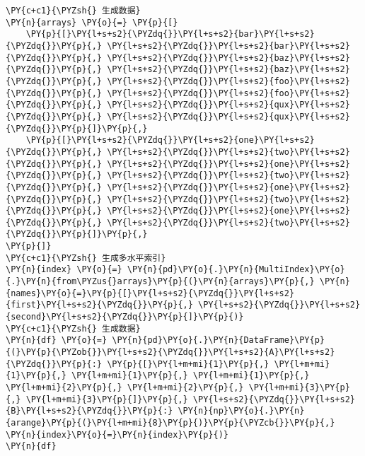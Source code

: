     \begin{tcolorbox}[breakable, size=fbox, boxrule=1pt, pad at break*=1mm,colback=cellbackground, colframe=cellborder]
\begin{Verbatim}[commandchars=\\\{\}]
\PY{c+c1}{\PYZsh{} 生成数据}
\PY{n}{arrays} \PY{o}{=} \PY{p}{[}
    \PY{p}{[}\PY{l+s+s2}{\PYZdq{}}\PY{l+s+s2}{bar}\PY{l+s+s2}{\PYZdq{}}\PY{p}{,} \PY{l+s+s2}{\PYZdq{}}\PY{l+s+s2}{bar}\PY{l+s+s2}{\PYZdq{}}\PY{p}{,} \PY{l+s+s2}{\PYZdq{}}\PY{l+s+s2}{baz}\PY{l+s+s2}{\PYZdq{}}\PY{p}{,} \PY{l+s+s2}{\PYZdq{}}\PY{l+s+s2}{baz}\PY{l+s+s2}{\PYZdq{}}\PY{p}{,} \PY{l+s+s2}{\PYZdq{}}\PY{l+s+s2}{foo}\PY{l+s+s2}{\PYZdq{}}\PY{p}{,} \PY{l+s+s2}{\PYZdq{}}\PY{l+s+s2}{foo}\PY{l+s+s2}{\PYZdq{}}\PY{p}{,} \PY{l+s+s2}{\PYZdq{}}\PY{l+s+s2}{qux}\PY{l+s+s2}{\PYZdq{}}\PY{p}{,} \PY{l+s+s2}{\PYZdq{}}\PY{l+s+s2}{qux}\PY{l+s+s2}{\PYZdq{}}\PY{p}{]}\PY{p}{,}
    \PY{p}{[}\PY{l+s+s2}{\PYZdq{}}\PY{l+s+s2}{one}\PY{l+s+s2}{\PYZdq{}}\PY{p}{,} \PY{l+s+s2}{\PYZdq{}}\PY{l+s+s2}{two}\PY{l+s+s2}{\PYZdq{}}\PY{p}{,} \PY{l+s+s2}{\PYZdq{}}\PY{l+s+s2}{one}\PY{l+s+s2}{\PYZdq{}}\PY{p}{,} \PY{l+s+s2}{\PYZdq{}}\PY{l+s+s2}{two}\PY{l+s+s2}{\PYZdq{}}\PY{p}{,} \PY{l+s+s2}{\PYZdq{}}\PY{l+s+s2}{one}\PY{l+s+s2}{\PYZdq{}}\PY{p}{,} \PY{l+s+s2}{\PYZdq{}}\PY{l+s+s2}{two}\PY{l+s+s2}{\PYZdq{}}\PY{p}{,} \PY{l+s+s2}{\PYZdq{}}\PY{l+s+s2}{one}\PY{l+s+s2}{\PYZdq{}}\PY{p}{,} \PY{l+s+s2}{\PYZdq{}}\PY{l+s+s2}{two}\PY{l+s+s2}{\PYZdq{}}\PY{p}{]}\PY{p}{,}
\PY{p}{]}
\PY{c+c1}{\PYZsh{} 生成多水平索引}
\PY{n}{index} \PY{o}{=} \PY{n}{pd}\PY{o}{.}\PY{n}{MultiIndex}\PY{o}{.}\PY{n}{from\PYZus{}arrays}\PY{p}{(}\PY{n}{arrays}\PY{p}{,} \PY{n}{names}\PY{o}{=}\PY{p}{[}\PY{l+s+s2}{\PYZdq{}}\PY{l+s+s2}{first}\PY{l+s+s2}{\PYZdq{}}\PY{p}{,} \PY{l+s+s2}{\PYZdq{}}\PY{l+s+s2}{second}\PY{l+s+s2}{\PYZdq{}}\PY{p}{]}\PY{p}{)}
\PY{c+c1}{\PYZsh{} 生成数据}
\PY{n}{df} \PY{o}{=} \PY{n}{pd}\PY{o}{.}\PY{n}{DataFrame}\PY{p}{(}\PY{p}{\PYZob{}}\PY{l+s+s2}{\PYZdq{}}\PY{l+s+s2}{A}\PY{l+s+s2}{\PYZdq{}}\PY{p}{:} \PY{p}{[}\PY{l+m+mi}{1}\PY{p}{,} \PY{l+m+mi}{1}\PY{p}{,} \PY{l+m+mi}{1}\PY{p}{,} \PY{l+m+mi}{1}\PY{p}{,} \PY{l+m+mi}{2}\PY{p}{,} \PY{l+m+mi}{2}\PY{p}{,} \PY{l+m+mi}{3}\PY{p}{,} \PY{l+m+mi}{3}\PY{p}{]}\PY{p}{,} \PY{l+s+s2}{\PYZdq{}}\PY{l+s+s2}{B}\PY{l+s+s2}{\PYZdq{}}\PY{p}{:} \PY{n}{np}\PY{o}{.}\PY{n}{arange}\PY{p}{(}\PY{l+m+mi}{8}\PY{p}{)}\PY{p}{\PYZcb{}}\PY{p}{,} \PY{n}{index}\PY{o}{=}\PY{n}{index}\PY{p}{)}
\PY{n}{df}
\end{Verbatim}
\end{tcolorbox}

